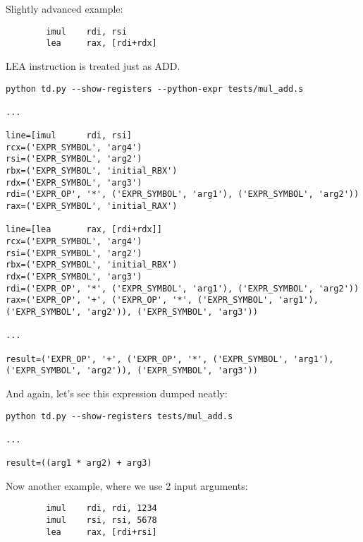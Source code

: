 Slightly advanced example:

\begin{lstlisting}
        imul    rdi, rsi
        lea     rax, [rdi+rdx]
\end{lstlisting}

LEA instruction is treated just as ADD.

\begin{lstlisting}
python td.py --show-registers --python-expr tests/mul_add.s

...

line=[imul      rdi, rsi]
rcx=('EXPR_SYMBOL', 'arg4')
rsi=('EXPR_SYMBOL', 'arg2')
rbx=('EXPR_SYMBOL', 'initial_RBX')
rdx=('EXPR_SYMBOL', 'arg3')
rdi=('EXPR_OP', '*', ('EXPR_SYMBOL', 'arg1'), ('EXPR_SYMBOL', 'arg2'))
rax=('EXPR_SYMBOL', 'initial_RAX')

line=[lea       rax, [rdi+rdx]]
rcx=('EXPR_SYMBOL', 'arg4')
rsi=('EXPR_SYMBOL', 'arg2')
rbx=('EXPR_SYMBOL', 'initial_RBX')
rdx=('EXPR_SYMBOL', 'arg3')
rdi=('EXPR_OP', '*', ('EXPR_SYMBOL', 'arg1'), ('EXPR_SYMBOL', 'arg2'))
rax=('EXPR_OP', '+', ('EXPR_OP', '*', ('EXPR_SYMBOL', 'arg1'), ('EXPR_SYMBOL', 'arg2')), ('EXPR_SYMBOL', 'arg3'))

...

result=('EXPR_OP', '+', ('EXPR_OP', '*', ('EXPR_SYMBOL', 'arg1'), ('EXPR_SYMBOL', 'arg2')), ('EXPR_SYMBOL', 'arg3'))
\end{lstlisting}

And again, let's see this expression dumped neatly:

\begin{lstlisting}
python td.py --show-registers tests/mul_add.s

...

result=((arg1 * arg2) + arg3)
\end{lstlisting}

Now another example, where we use 2 input arguments:

\begin{lstlisting}
        imul    rdi, rdi, 1234
        imul    rsi, rsi, 5678
        lea     rax, [rdi+rsi]
\end{lstlisting}

